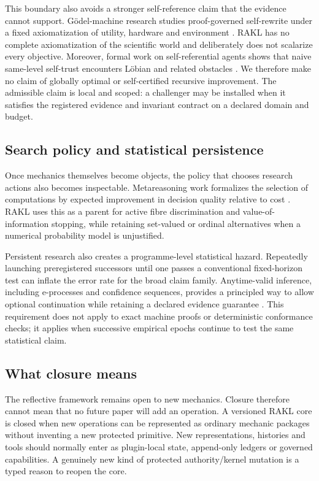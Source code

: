 This boundary also avoids a stronger self-reference claim that the evidence cannot support. G\"odel-machine research studies proof-governed self-rewrite under a fixed axiomatization of utility, hardware and environment \cite{schmidhuber2007godel}. RAKL has no complete axiomatization of the scientific world and deliberately does not scalarize every objective. Moreover, formal work on self-referential agents shows that naive same-level self-trust encounters L\"obian and related obstacles \cite{fallenstein2014selfref}. We therefore make no claim of globally optimal or self-certified recursive improvement. The admissible claim is local and scoped: a challenger may be installed when it satisfies the registered evidence and invariant contract on a declared domain and budget.

\subsection{Search policy and statistical persistence}

Once mechanics themselves become objects, the policy that chooses research actions also becomes inspectable. Metareasoning work formalizes the selection of computations by expected improvement in decision quality relative to cost \cite{hay2014computations}. RAKL uses this as a parent for active fibre discrimination and value-of-information stopping, while retaining set-valued or ordinal alternatives when a numerical probability model is unjustified.

Persistent research also creates a programme-level statistical hazard. Repeatedly launching preregistered successors until one passes a conventional fixed-horizon test can inflate the error rate for the broad claim family. Anytime-valid inference, including e-processes and confidence sequences, provides a principled way to allow optional continuation while retaining a declared evidence guarantee \cite{ramdas2023}. This requirement does not apply to exact machine proofs or deterministic conformance checks; it applies when successive empirical epochs continue to test the same statistical claim.

\subsection{What closure means}

The reflective framework remains open to new mechanics. Closure therefore cannot mean that no future paper will add an operation. A versioned RAKL core is closed when new operations can be represented as ordinary mechanic packages without inventing a new protected primitive. New representations, histories and tools should normally enter as plugin-local state, append-only ledgers or governed capabilities. A genuinely new kind of protected authority/kernel mutation is a typed reason to reopen the core.

